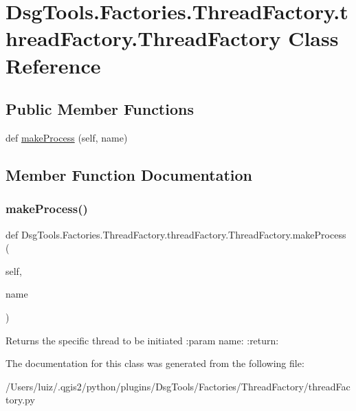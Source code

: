 \hypertarget{class_dsg_tools_1_1_factories_1_1_thread_factory_1_1thread_factory_1_1_thread_factory}{}\section{Dsg\+Tools.\+Factories.\+Thread\+Factory.\+thread\+Factory.\+Thread\+Factory Class Reference}
\label{class_dsg_tools_1_1_factories_1_1_thread_factory_1_1thread_factory_1_1_thread_factory}
\subsection*{Public Member Functions}
\begin{DoxyCompactItemize}
\item 
def \mbox{\hyperlink{class_dsg_tools_1_1_factories_1_1_thread_factory_1_1thread_factory_1_1_thread_factory_a59c9497061feb76449980578aaa984ff}{make\+Process}} (self, name)
\end{DoxyCompactItemize}


\subsection{Member Function Documentation}
\mbox{\label{class_dsg_tools_1_1_factories_1_1_thread_factory_1_1thread_factory_1_1_thread_factory_a59c9497061feb76449980578aaa984ff}} 
\subsubsection{\texorpdfstring{make\+Process()}{makeProcess()}}
{\footnotesize\ttfamily def Dsg\+Tools.\+Factories.\+Thread\+Factory.\+thread\+Factory.\+Thread\+Factory.\+make\+Process (\begin{DoxyParamCaption}\item[{}]{self,  }\item[{}]{name }\end{DoxyParamCaption})}

\begin{DoxyVerb}Returns the specific thread to be initiated
:param name:
:return:
\end{DoxyVerb}
 

The documentation for this class was generated from the following file\+:\begin{DoxyCompactItemize}
\item 
/\+Users/luiz/.\+qgis2/python/plugins/\+Dsg\+Tools/\+Factories/\+Thread\+Factory/thread\+Factory.\+py\end{DoxyCompactItemize}
